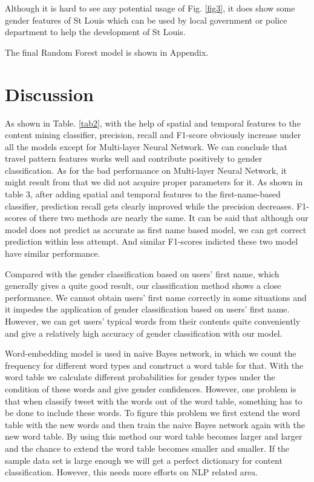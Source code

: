 \documentclass{article}
\begin{document}
Although it is hard to see any potential usage of  Fig. \ref{fig3}, it does show some gender features of St Louis which can be used by local government or  police department to  help the development of St Louis.

The final Random Forest model is shown in Appendix. 

\section{Discussion}

As shown in Table. \ref{tab2}, with the help of spatial and temporal features  to the content mining classifier, precision, recall and F1-score obviously increase under all the models except for Multi-layer Neural Network. We can conclude that travel pattern features works well and contribute positively to gender classification. As for the bad performance on Multi-layer Neural Network, it might result from that we did not acquire proper parameters for it. As shown in table 3, after adding spatial and temporal features to the first-name-based classifier, prediction recall gets clearly improved while the precision decreases. F1-scores of there two methods are nearly the same. It can be said that although our model does not predict as accurate as first name based model, we can get correct prediction within less attempt. And similar F1-scores indicted these two model have similar performance.


Compared with the gender classification based on users' first name, which generally gives a quite good result, our classification method shows a close performance. We cannot obtain users' first name correctly in some situations and it impedes the application of gender classification based on users' first name. However, we can get users' typical words from their contents quite conveniently and give a relatively high accuracy of gender classification with our model.

Word-embedding model is used in naive Bayes network, in which we count the frequency for different word types and construct a word table for that. With the word table we calculate different probabilities for gender types under the condition of these words and give gender confidences. However, one problem is that when classify tweet with the words out of the word table, something has to be done to include these words. To figure this problem we first extend the word table with the new words and then train the naive Bayes network again with the new word table. By using this method our word table becomes larger and larger and the chance to extend the word table becomes smaller and smaller. If the sample data set is large enough we will get a perfect dictionary for content classification. However, this needs more efforts on NLP related area.
\end{document}
